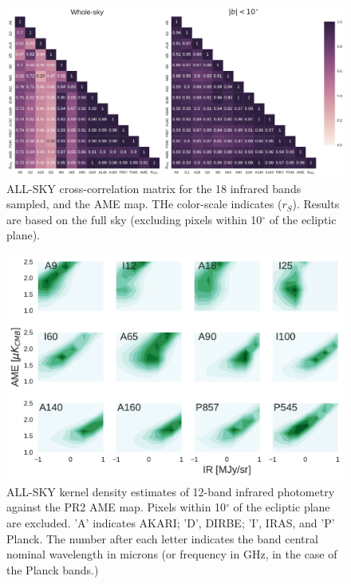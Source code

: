       \begin{figure}
        \label{fig:AME_IR_crosscorr_allbandsg}
        \includegraphics[width=185mm]{../Plots/all_bands_corr_matrix_wAME_spearman.pdf}
        \centering
        \caption{ALL-SKY cross-correlation matrix for the 18 infrared bands sampled, and the AME map. THe color-scale indicates ($r_{S}$). Results are based on the full sky (excluding pixels within 10$^{\circ}$ of the ecliptic plane).}
      \end{figure}

      \begin{figure}
        \label{fig:AMEvsDust_allsky_allbands}
        \includegraphics[width=150mm]{../Plots/AMEvsDust_allsky_allbands.pdf}
        \centering
        \caption{ALL-SKY kernel density estimates of 12-band infrared photometry against the PR2 AME map. Pixels within 10$^{\circ}$ of the ecliptic plane are excluded. 'A' indicates AKARI; 'D', DIRBE; 'I', IRAS, and 'P' Planck. The number after each letter indicates the band central nominal wavelength in microns (or frequency in GHz, in the case of the Planck bands.) }
      \end{figure}

